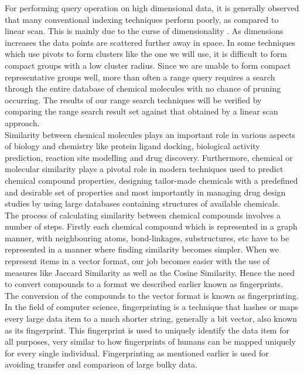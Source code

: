 For performing query operation on high dimensional data, it is generally observed that many conventional indexing techniques perform poorly, as compared to linear scan. This is mainly due to the curse of dimensionality . As dimensions increases the data points are scattered further away in space. In some techniques which use pivots to form clusters like the one we will use, it is difficult to form compact groups with a low cluster radius. Since we are unable to form compact representative groups well, more than often a range query requires a search through the entire database of chemical molecules with no chance of pruning occurring.  The results of our range search techniques will be verified by comparing the range search result set against that obtained by a linear scan approach.\\

Similarity between chemical molecules plays an important role in various aspects of biology and chemistry like protein ligand docking, biological activity prediction, reaction site modelling and drug discovery. Furthermore, chemical or molecular similarity  plays a pivotal role in modern techniques used to predict chemical compound properties, designing tailor-made chemicals with a predefined and desirable set of properties and most importantly in managing drug design studies by using large databases containing structures of available chemicals.\\

The process of calculating similarity between chemical compounds involves a number of steps. Firstly each chemical compound which is represented in a graph manner, with neighbouring atoms, bond-linkages, substructures, etc have to be represented in a manner where finding similarity becomes simpler. When we represent items in a vector format, our job becomes easier with the use of measures like Jaccard Similarity as well as the Cosine Similarity. Hence the need to convert compounds to a format we described earlier known as fingerprints. \\

The conversion of the compounds to the vector format is known as fingerprinting. In the field of computer science, fingerprinting is a technique that hashes or maps every large data item to a much shorter string, generally a bit vector, also known as its fingerprint. This fingerprint is used to uniquely identify the data item for all purposes, very similar to how fingerprints of humans can be mapped uniquely for every single individual. Fingerprinting as mentioned earlier is used for avoiding transfer and comparison of large bulky data. \\

